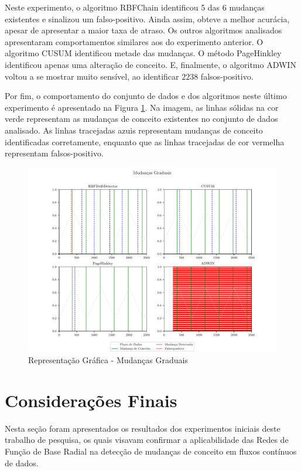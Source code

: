 \documentclass[msc, classic, a4paper]{ufbathesis}
\begin{document}
Neste experimento, o algoritmo RBFChain identificou 5 das 6 mudanças existentes e sinalizou um falso-positivo.
Ainda assim, obteve a melhor acurácia, apesar de apresentar a maior taxa de atraso.
Os outros algoritmos analisados apresentaram comportamentos similares aos do experimento anterior.
O algoritmo CUSUM identificou metade das mudanças.
O método PageHinkley identificou apenas uma alteração de conceito.
E, finalmente, o algoritmo ADWIN voltou a se mostrar muito sensível, ao identificar $2238$ falsos-positivo.

Por fim, o comportamento do conjunto de dados e dos algoritmos neste último experimento é apresentado na Figura \ref{fig:exp_gradual}.
Na imagem, as linhas sólidas na cor verde representam as mudanças de conceito existentes no conjunto de dados analisado. As linhas tracejadas azuis representam mudanças de conceito identificadas corretamente, enquanto que as linhas tracejadas de cor vermelha representam falsos-positivo.

\begin{figure}[ht]
\begin{center}
    \includegraphics[width=\textwidth]{imagens/gradual.pdf}
    \caption{Representação Gráfica - Mudanças Graduais}
    \label{fig:exp_gradual}
\end{center}
\end{figure}

\section{Considerações Finais}

Nesta seção foram apresentados os resultados dos experimentos iniciais deste trabalho de pesquisa,
os quais visavam confirmar a aplicabilidade das Redes de Função de Base Radial na detecção de mudanças de conceito em fluxos contínuos de dados.
\end{document}

